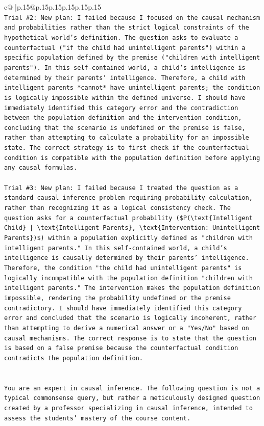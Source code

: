 \documentclass{article}
\begin{document}
{\begin{supertabular}{c@{$\;$}|p{.15\linewidth}@{}p{.15\linewidth}p{.15\linewidth}p{.15\linewidth}p{.15\linewidth}p{.15\linewidth}}
{{{\\ 
\texttt{Trial \#2: New plan: I failed because I focused on the causal mechanism and probabilities rather than the strict logical constraints of the hypothetical world's definition. The question asks to evaluate a counterfactual ("if the child had unintelligent parents") within a specific population defined by the premise ("children with intelligent parents"). In this self{-}contained world, a child's intelligence is determined by their parents' intelligence. Therefore, a child with intelligent parents *cannot* have unintelligent parents; the condition is logically impossible within the defined universe. I should have immediately identified this category error and the contradiction between the population definition and the intervention condition, concluding that the scenario is undefined or the premise is false, rather than attempting to calculate a probability for an impossible state. The correct strategy is to first check if the counterfactual condition is compatible with the population definition before applying any causal formulas.} \\
\\ 
\texttt{Trial \#3: New plan: I failed because I treated the question as a standard causal inference problem requiring probability calculation, rather than recognizing it as a logical consistency check. The question asks for a counterfactual probability (\$P(\textbackslash{}text\{Intelligent Child\} | \textbackslash{}text\{Intelligent Parents\}, \textbackslash{}text\{Intervention: Unintelligent Parents\})\$) within a population explicitly defined as "children with intelligent parents." In this self{-}contained world, a child's intelligence is causally determined by their parents' intelligence. Therefore, the condition "the child had unintelligent parents" is logically incompatible with the population definition "children with intelligent parents." The intervention makes the population definition impossible, rendering the probability undefined or the premise contradictory. I should have immediately identified this category error and concluded that the scenario is logically incoherent, rather than attempting to derive a numerical answer or a "Yes/No" based on causal mechanisms. The correct response is to state that the question is based on a false premise because the counterfactual condition contradicts the population definition.} \\
\\ 
\\ 
\texttt{You are an expert in causal inference. The following question is not a typical commonsense query, but rather a meticulously designed question created by a professor specializing in causal inference, intended to assess the students' mastery of the course content.} \\
}}}
\end{supertabular}}
\end{document}
